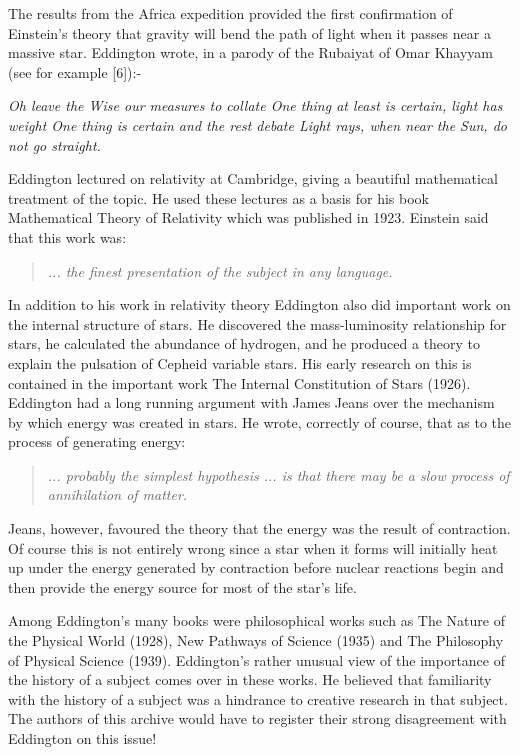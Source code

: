The results from the Africa expedition provided the first confirmation of Einstein's theory that gravity will bend the path of light when it passes near a massive star. Eddington wrote, in a parody of the Rubaiyat of Omar Khayyam (see for example [6]):-

\textit{Oh leave the Wise our measures to collate
One thing at least is certain, light has weight
One thing is certain and the rest debate
Light rays, when near the Sun, do not go straight.}

Eddington lectured on relativity at Cambridge, giving a beautiful mathematical treatment of the topic. He used these lectures as a basis for his book Mathematical Theory of Relativity which was published in 1923. Einstein said that this work was:
\begin{quote}
\textit{... the finest presentation of the subject in any language.}
\end{quote}

In addition to his work in relativity theory Eddington also did important work on the internal structure of stars. He discovered the mass-luminosity relationship for stars, he calculated the abundance of hydrogen, and he produced a theory to explain the pulsation of Cepheid variable stars. His early research on this is contained in the important work The Internal Constitution of Stars (1926). Eddington had a long running argument with James Jeans over the mechanism by which energy was created in stars. He wrote, correctly of course, that as to the process of generating energy:
\begin{quote}
\textit{... probably the simplest hypothesis ... is that there may be a slow process of annihilation of matter.}
\end{quote}

Jeans, however, favoured the theory that the energy was the result of contraction. Of course this is not entirely wrong since a star when it forms will initially heat up under the energy generated by contraction before nuclear reactions begin and then provide the energy source for most of the star's life.

Among Eddington's many books were philosophical works such as The Nature of the Physical World (1928), New Pathways of Science (1935) and The Philosophy of Physical Science (1939). Eddington's rather unusual view of the importance of the history of a subject comes over in these works. He believed that familiarity with the history of a subject was a hindrance to creative research in that subject. The authors of this archive would have to register their strong disagreement with Eddington on this issue!

